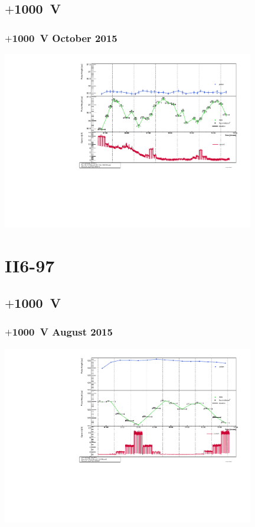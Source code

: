 \documentclass[9pt]{beamer}
\begin{document}
\subsection{$+$\SI{1000}{V}}
\begin{frame}
	\frametitle{$+$\SI{1000}{V} October 2015}
	\vspace*{-15pt}
	\begin{center}
		\includegraphics[angle=270, width=11cm]{PhPulserCurrent_201510_rp101B2.pdf}
	\end{center}
\end{frame}
\section{II6-97}
\subsection{$+$\SI{1000}{V}}
\begin{frame}
	\frametitle{$+$\SI{1000}{V} August 2015}
	\vspace*{-15pt}
	\begin{center}
		\includegraphics[angle=270, width=11cm]{PhPulserCurrent_201508_rp1397}
	\end{center}
\end{frame}
\end{document}
